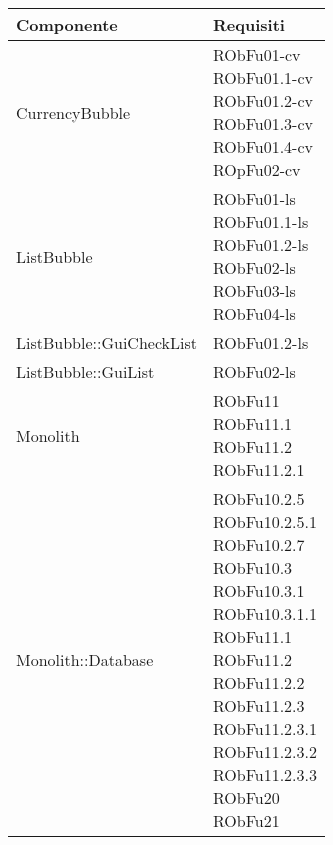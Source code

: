 \begin{center}
\begin{longtable}{|
*{1}{>{\centering\arraybackslash}m{7.5cm}|}
*{1}{>{\centering\arraybackslash}m{2.5cm}|}}
\hline \textbf{Componente} & \textbf{Requisiti}\\
\hline \endhead
\hline \endfoot

CurrencyBubble & \makecell{RObFu01-cv
\\RObFu01.1-cv
\\RObFu01.2-cv
\\RObFu01.3-cv
\\RObFu01.4-cv
\\ROpFu02-cv
\\}\\\hline
ListBubble & \makecell{RObFu01-ls
\\RObFu01.1-ls
\\RObFu01.2-ls
\\RObFu02-ls
\\RObFu03-ls
\\RObFu04-ls
\\}\\\hline
ListBubble::GuiCheckList & \makecell{RObFu01.2-ls
\\}\\\hline
ListBubble::GuiList & \makecell{RObFu02-ls
\\}\\\hline
Monolith & \makecell{RObFu11
\\RObFu11.1
\\RObFu11.2
\\RObFu11.2.1
\\}\\\hline
Monolith::Database & \makecell{RObFu10.2.5
\\RObFu10.2.5.1
\\RObFu10.2.7
\\RObFu10.3
\\RObFu10.3.1
\\RObFu10.3.1.1
\\RObFu11.1
\\RObFu11.2
\\RObFu11.2.2
\\RObFu11.2.3
\\RObFu11.2.3.1
\\RObFu11.2.3.2
\\RObFu11.2.3.3
\\RObFu20
\\RObFu21
\\}\\\hline

\end{longtable}
\end{center}

